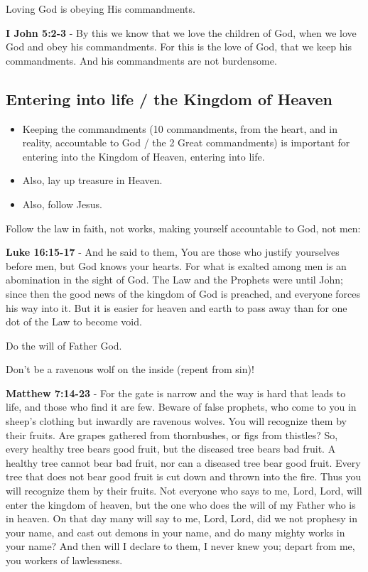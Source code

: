 \documentclass[11pt]{article}
\begin{document}
Loving God is obeying His commandments.

\textbf{I John 5:2-3} - By this we know that we love the children of God, when we love God and obey his commandments. For this is the love of God, that we keep his commandments. And his commandments are not burdensome.

\subsection{Entering into life / the Kingdom of Heaven}
\label{sec:org07629cc}
\begin{itemize}
\item Keeping the commandments (10 commandments, from the heart, and in reality, accountable to God / the 2 Great commandments) is important for entering into the Kingdom of Heaven, entering into life.
\item Also, lay up treasure in Heaven.
\item Also, follow Jesus.
\end{itemize}

Follow the law in faith, not works, making yourself accountable to God, not men:

\textbf{Luke 16:15-17} - And he said to them, You are those who justify yourselves before men, but God knows your hearts. For what is exalted among men is an abomination in the sight of God.  The Law and the Prophets were until John; since then the good news of the kingdom of God is preached, and everyone forces his way into it.  But it is easier for heaven and earth to pass away than for one dot of the Law to become void.

Do the will of Father God.

Don't be a ravenous wolf on the inside (repent from sin)!

\textbf{Matthew 7:14-23} - For the gate is narrow and the way is hard that leads to life, and those who find it are few.  Beware of false prophets, who come to you in sheep's clothing but inwardly are ravenous wolves.  You will recognize them by their fruits. Are grapes gathered from thornbushes, or figs from thistles?  So, every healthy tree bears good fruit, but the diseased tree bears bad fruit.  A healthy tree cannot bear bad fruit, nor can a diseased tree bear good fruit.  Every tree that does not bear good fruit is cut down and thrown into the fire.  Thus you will recognize them by their fruits.  Not everyone who says to me, Lord, Lord, will enter the kingdom of heaven, but the one who does the will of my Father who is in heaven.  On that day many will say to me, Lord, Lord, did we not prophesy in your name, and cast out demons in your name, and do many mighty works in your name?  And then will I declare to them, I never knew you; depart from me, you workers of lawlessness.
\end{document}

